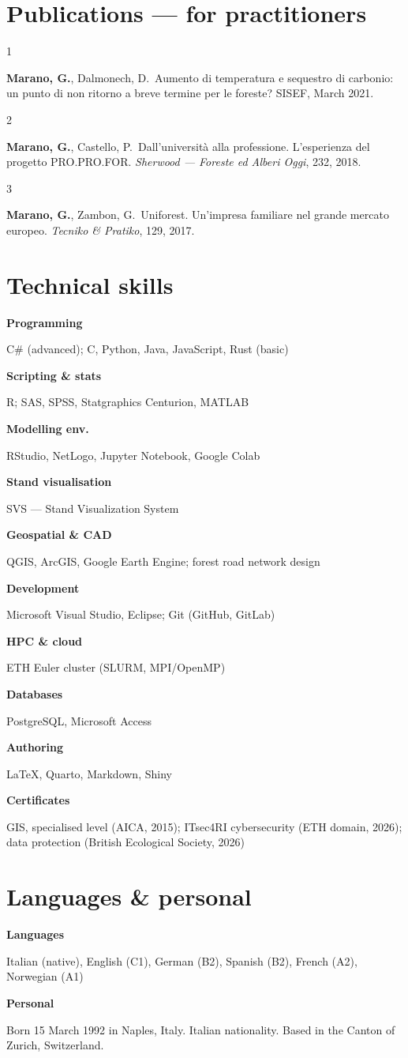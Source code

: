 \documentclass[10pt,a4paper]{article}
\newlength{\dcol}\setlength{\dcol}{3.5cm}
\newcommand{\defrow}[2]{%
  \noindent\begin{minipage}[t]{\dcol}\raggedright\footnotesize\bfseries\color{muted}#1\end{minipage}%
  \hspace{0.45cm}%
  \begin{minipage}[t]{\dimexpr\linewidth-\dcol-0.45cm\relax}\raggedright\small\color{inksoft}#2\end{minipage}\par\vspace{5pt}}
\newcommand{\pubitem}[3]{%
  \noindent\begin{minipage}[t]{0.6cm}\raggedright\footnotesize\color{muted}#1\end{minipage}%
  \begin{minipage}[t]{\dimexpr\linewidth-0.6cm\relax}\raggedright\small #2\ {\color{inksoft}#3}\end{minipage}\par\vspace{4pt}}
\newcommand{\me}{\textbf{Marano, G.}}
\begin{document}
\section*{Publications --- for practitioners}
\pubitem{1}{\me, Dalmonech, D.}{Aumento di temperatura e sequestro di carbonio: un punto di non ritorno a breve termine per le foreste? SISEF, March 2021.}
\pubitem{2}{\me, Castello, P.}{Dall'universit\`a alla professione. L'esperienza del progetto PRO.PRO.FOR. \emph{Sherwood --- Foreste ed Alberi Oggi}, 232, 2018.}
\pubitem{3}{\me, Zambon, G.}{Uniforest. Un'impresa familiare nel grande mercato europeo. \emph{Tecniko \& Pratiko}, 129, 2017.}

\section*{Technical skills}
\defrow{Programming}{C\# (advanced); C, Python, Java, JavaScript, Rust (basic)}
\defrow{Scripting \& stats}{R; SAS, SPSS, Statgraphics Centurion, MATLAB}
\defrow{Modelling env.}{RStudio, NetLogo, Jupyter Notebook, Google Colab}
\defrow{Stand visualisation}{SVS --- Stand Visualization System}
\defrow{Geospatial \& CAD}{QGIS, ArcGIS, Google Earth Engine; forest road network design}
\defrow{Development}{Microsoft Visual Studio, Eclipse; Git (GitHub, GitLab)}
\defrow{HPC \& cloud}{ETH Euler cluster (SLURM, MPI/OpenMP)}
\defrow{Databases}{PostgreSQL, Microsoft Access}
\defrow{Authoring}{\LaTeX, Quarto, Markdown, Shiny}
\defrow{Certificates}{GIS, specialised level (AICA, 2015); ITsec4RI cybersecurity (ETH domain, 2026); data protection (British Ecological Society, 2026)}

\section*{Languages \& personal}
\defrow{Languages}{Italian (native), English (C1), German (B2), Spanish (B2), French (A2), Norwegian (A1)}
\defrow{Personal}{Born 15 March 1992 in Naples, Italy. Italian nationality. Based in the Canton of Zurich, Switzerland.}
\end{document}
